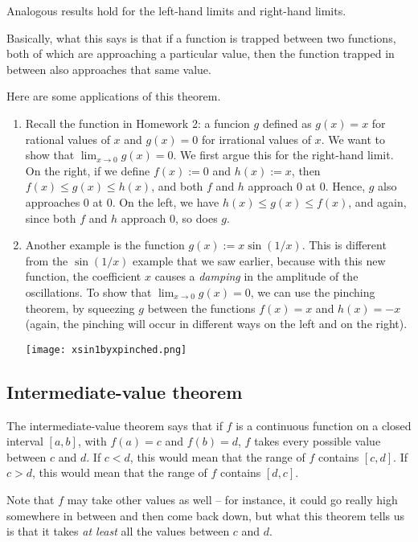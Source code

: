 \documentclass[10pt]{amsart}
\begin{document}
Analogous results hold for the left-hand limits and right-hand limits.

Basically, what this says is that if a function is trapped between two
functions, both of which are approaching a particular value, then the
function trapped in between also approaches that same value.

Here are some applications of this theorem.

\begin{enumerate}

\item Recall the function in Homework 2: a funcion $g$ defined as
  $g(x) = x$ for rational values of $x$ and $g(x) = 0$ for irrational
  values of $x$. We want to show that $\lim_{x \to 0} g(x) = 0$. We
  first argue this for the right-hand limit. On the right, if we
  define $f(x) := 0$ and $h(x) := x$, then $f(x) \le g(x) \le h(x)$,
  and both $f$ and $h$ approach $0$ at $0$. Hence, $g$ also approaches
  $0$ at $0$. On the left, we have $h(x) \le g(x) \le f(x)$, and
  again, since both $f$ and $h$ approach $0$, so does $g$.
 
\item Another example is the function $g(x) := x \sin (1/x)$. This is
  different from the $\sin(1/x)$ example that we saw earlier, because
  with this new function, the coefficient $x$ causes a {\em damping}
  in the amplitude of the oscillations. To show that $\lim_{x \to 0}
  g(x) = 0$, we can use the pinching theorem, by squeezing $g$ between
  the functions $f(x) = x$ and $h(x) = -x$ (again, the pinching will
  occur in different ways on the left and on the right).

  \texttt{[image: xsin1byxpinched.png]}
\end{enumerate}

\subsection*{Intermediate-value theorem}

The intermediate-value theorem says that if $f$ is a continuous
function on a closed interval $[a,b]$, with $f(a) = c$ and $f(b) = d$,
$f$ takes every possible value between $c$ and $d$. If $c < d$, this
would mean that the range of $f$ contains $[c,d]$. If $c > d$, this
would mean that the range of $f$ contains $[d,c]$.

Note that $f$ may take other values as well -- for instance, it could
go really high somewhere in between and then come back down, but what
this theorem tells us is that it takes {\em at least} all the values
between $c$ and $d$.
\end{document}
